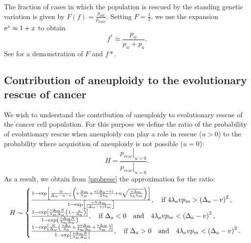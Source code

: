 \documentclass[12pt]{extarticle}
\newcommand{\e}{{\rm e}}
\begin{document}
The fraction of cases in which the population is rescued by the standing genetic variation is given by $F\left(f\right)=\frac{p_{old}}{p_{total}}$.
Setting $F=\frac{1}{2}$, we use the expansion $\e^x \approx 1+x$ to obtain
\begin{equation}\label{halfeqstandvar}
f^*\approx\frac{p_w}{p_w+p_a}.
\end{equation}
See  for a demonstration of $F$ and $f*$.

\subsection*{Contribution of aneuploidy to the evolutionary rescue of cancer}
We wish to understand the contribution of aneuploidy to evolutionary rescue of the cancer cell population. For this purpose we define the ratio of the probability of evolutionary rescue when aneuploidy can play a role in rescue ($u>0$) to the probability where acquisition of aneuploidy is not possible ($u=0$):
\begin{equation}\label{ratiorescueexact}
H=\frac{\left.p_{resc}\right|_{u>0}}{\left.p_{resc}\right|_{u=0}}.
\end{equation}
As a result, we obtain from \eqref{probresc} the approximation for the ratio:
\begin{equation}\label{ratiorescue}
H\sim\left\{
  \begin{array}{@{}ll@{}}
  \frac{1-\exp\left[\frac{N}{\Delta_w-u-v}\left(v\frac{\Delta_m}{\lambda_m}+\frac{u\left(\Delta_a-v\right)}{2\lambda_a}+u\sqrt{\frac{v\Delta_m}{\lambda_a\lambda_m}}\right)\right]}{1-\exp\left[\frac{vN\Delta_m}{\left(\Delta_w-v\right)\lambda_m}\right]},\quad\text{if }4\lambda_avp_m>\left(\Delta_a-v\right)^2,\\
   \frac{1-\exp\left[\frac{v\Delta_mN}{\lambda_m\Delta_w}\left(1-\frac{u}{\Delta_a}\right)\right]}{1-\exp\left(\frac{v\Delta_mN}{\lambda_m\Delta_w}\right)},\quad\text{if }\Delta_a<0\quad\text{and}\quad4\lambda_avp_m<\left(\Delta_a-v\right)^2,\\
   \frac{1-\exp\left[\frac{N}{\Delta_w}\left(\frac{u\Delta_a}{\lambda_a}+\frac{uv\Delta_m}{\lambda_m\Delta_a}+\frac{v\Delta_m}{\lambda_m}\right)\right]}{1-\exp\left[\frac{v\Delta_mN}{\lambda_m\Delta_w}\right]},\quad\text{if }\Delta_a>0\quad\text{and}\quad4\lambda_avp_m<\left(\Delta_a-v\right)^2.
  \end{array}\right.
\end{equation}
\end{document}
